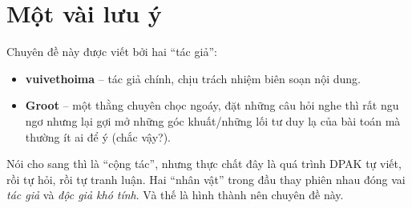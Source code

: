 \section{Một vài lưu ý}
Chuyên đề này được viết bởi hai ``tác giả'':

\begin{itemize}
    \item \textbf{vuivethoima} – tác giả chính, chịu trách nhiệm biên soạn nội dung.
    \item \textbf{Groot} – một thằng chuyên chọc ngoáy, đặt những câu hỏi nghe thì rất ngu ngơ nhưng lại gợi mở những góc khuất/những lối tư duy lạ của bài toán mà thường ít ai để ý (chắc vậy?).
\end{itemize}

Nói cho sang thì là ``cộng tác'', nhưng thực chất đây là quá trình DPAK tự viết, rồi tự hỏi, rồi tự tranh luận. Hai ``nhân vật'' trong đầu thay phiên nhau đóng vai \textit{tác giả} và \textit{độc giả khó tính}. Và thế là hình thành nên chuyên đề này.
